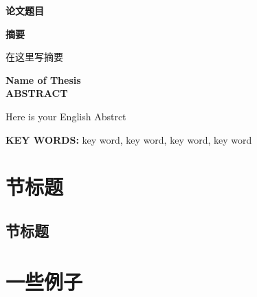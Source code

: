\documentclass[12pt,a4paper,UTF8]{article}
\begin{document}
\setlength{\baselineskip}{20pt}


\setcounter{page}{1}

\begin{center}
\vspace*{1.3mm}
{\heiti{}\textbf{论文题目}}\\
\vspace{11mm}

{\heiti
\textbf{摘}\hspace{5.3mm}\textbf{要}}
\end{center}
\vspace{4.5mm}
{
\noindent\phantom{空格}%
在这里写摘要
}

\vspace{11.5mm}%

\noindent{}


\newpage

\begin{center}
	\vspace*{-3.8mm}
	{\textbf{Name of Thesis}}\\
	\vspace{20.5mm}
	{
	\textbf{ABSTRACT}}
\end{center}
\vspace{7.6mm}
{
\noindent\phantom{空格}%
Here is your English Abstrct}

\vspace{16.2mm}
\noindent\hspace{10.6mm}
\textbf{KEY WORDS:} {key word, key word, key word, key word}


\newpage


\setcounter{page}{1}

{\centering\tableofcontents}
\newpage

\setcounter{page}{1}

\section{节标题}
\subsection{节标题}

\newpage

\section{一些例子}
\end{document}
